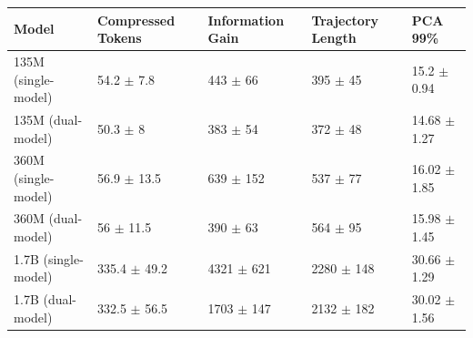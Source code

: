 \begin{tabular}{lllll}
\toprule
 Model               & Compressed Tokens         & Information Gain        & Trajectory Length       & PCA 99\%                   \\
\midrule
 135M (single-model) & 54.2 {\small $\pm$ 7.8}   & 443 {\small $\pm$ 66}   & 395 {\small $\pm$ 45}   & 15.2 {\small $\pm$ 0.94}  \\
 135M (dual-model)   & 50.3 {\small $\pm$ 8}     & 383 {\small $\pm$ 54}   & 372 {\small $\pm$ 48}   & 14.68 {\small $\pm$ 1.27} \\
 \midrule
 360M (single-model) & 56.9 {\small $\pm$ 13.5}  & 639 {\small $\pm$ 152}  & 537 {\small $\pm$ 77}   & 16.02 {\small $\pm$ 1.85} \\
 360M (dual-model)   & 56 {\small $\pm$ 11.5}    & 390 {\small $\pm$ 63}   & 564 {\small $\pm$ 95}   & 15.98 {\small $\pm$ 1.45} \\
 \midrule
 1.7B (single-model) & 335.4 {\small $\pm$ 49.2} & 4321 {\small $\pm$ 621} & 2280 {\small $\pm$ 148} & 30.66 {\small $\pm$ 1.29} \\
 1.7B (dual-model)   & 332.5 {\small $\pm$ 56.5} & 1703 {\small $\pm$ 147} & 2132 {\small $\pm$ 182} & 30.02 {\small $\pm$ 1.56} \\
\bottomrule
\end{tabular}
